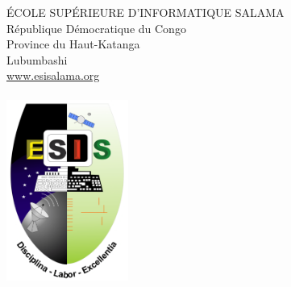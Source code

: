 \begin{titlepage}
	
	\vfill\vfill\vfill %
	
	\textbf{\MATfc}
\end{titlepage}

\begin{titlepage} %
	\center %
	
	
	{\large ÉCOLE SUPÉRIEURE D’INFORMATIQUE SALAMA}\\ %
	
	{\large République Démocratique du Congo}\\ %
	
	{\large Province du Haut-Katanga}\\ %
	
	{\large Lubumbashi}\\ %
	
	{\large \href{www.esisalama.org}{www.esisalama.org}}\\[0.25cm] %
	
	\HHRule\\[1cm]

    \includegraphics[width=40mm]{images/logoesis.png}\\[0.5cm]

	
	\HRule\\[0.4cm]
	

\end{titlepage}
